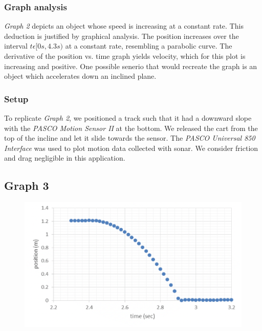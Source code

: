 \documentclass[11pt, letterpaper, includehead]{article}
\begin{document}
  \subsubsection{Graph analysis}
  \emph{Graph 2} depicts an object whose speed is increasing at a constant rate. This deduction is 
  justified by graphical analysis. The position increases over the interval 
  $t\epsilon[0s, 4.3s)$ at a constant rate, resembling a parabolic curve. The derivative of the 
  position vs. time graph yields velocity, which for this plot is increasing and positive. One 
  possible senerio that would recreate the graph is an object which accelerates down an inclined plane.\\
  
  \subsubsection{Setup}
  To replicate \emph{Graph 2}, we positioned a track such that it had a downward slope with the 
  \emph{PASCO Motion Sensor II} at the bottom. We released the cart from the top of the incline 
  and let it slide towards the sensor. The \emph{PASCO Universal 850 Interface} was used 
  to plot motion data collected with sonar. We consider friction and drag negligible in 
  this application.
  
  \subsection{Graph 3}

  \begin{figure}[H] %
    \centering 
    \includegraphics[width=\linewidth]{graph_3.png}
  \end{figure}
\end{document}
